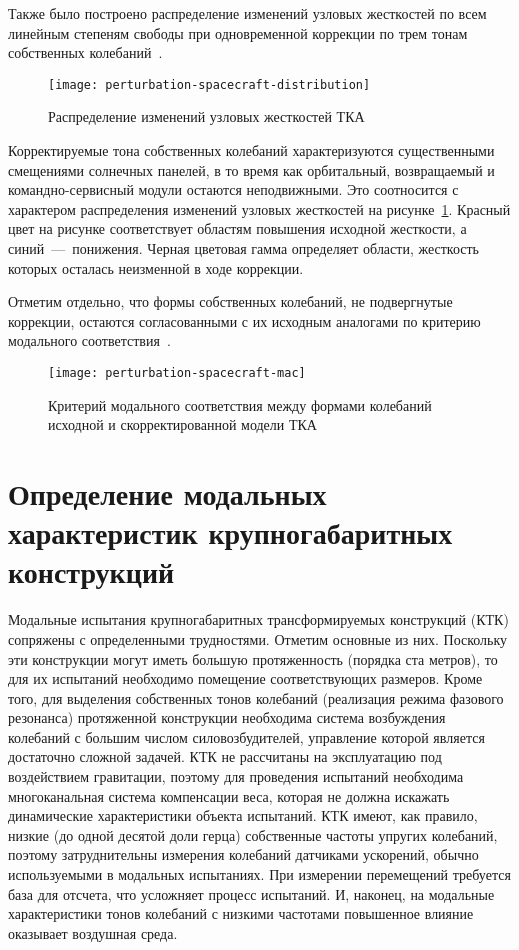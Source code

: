 Также было построено распределение изменений узловых жесткостей по всем линейным степеням свободы при одновременной коррекции по трем тонам собственных колебаний~.

\begin{figure}[H]
	\centering
	\texttt{[image: perturbation-spacecraft-distribution]}
	\caption{Распределение изменений узловых жесткостей ТКА} \label{fig:perturbation-spacecraft-distribution}
\end{figure}

Корректируемые тона собственных колебаний характеризуются существенными смещениями солнечных панелей, в то время как орбитальный, возвращаемый и командно-сервисный модули остаются неподвижными. Это соотносится с характером распределения изменений узловых жесткостей на рисунке~\ref{fig:perturbation-spacecraft-distribution}. Красный цвет на рисунке соответствует областям повышения исходной жесткости, а синий~---~понижения. Черная цветовая гамма определяет области, жесткость которых осталась неизменной в ходе коррекции.

Отметим отдельно, что формы собственных колебаний, не подвергнутые коррекции, остаются согласованными с их исходным аналогами по критерию модального соответствия~.

\begin{figure}[!htb]
	\centering
	\texttt{[image: perturbation-spacecraft-mac]}
	\caption{Критерий модального соответствия между формами колебаний исходной и скорректированной модели ТКА} \label{fig:perturbation-spacecraft-mac}
\end{figure}

\section{Определение модальных характеристик крупногабаритных конструкций}

Модальные испытания крупногабаритных трансформируемых конструкций (КТК) сопряжены с определенными трудностями. Отметим основные из них. Поскольку эти конструкции могут иметь большую протяженность (порядка ста метров), то для их испытаний необходимо помещение соответствующих размеров. Кроме того, для выделения собственных тонов колебаний (реализация режима фазового резонанса) протяженной конструкции необходима система возбуждения колебаний с большим числом силовозбудителей, управление которой является достаточно сложной задачей. КТК не рассчитаны на эксплуатацию под воздействием гравитации, поэтому для проведения испытаний необходима многоканальная система компенсации веса, которая не должна искажать динамические характеристики объекта испытаний. КТК имеют, как правило, низкие (до одной десятой доли герца) собственные частоты упругих колебаний, поэтому затруднительны измерения колебаний датчиками ускорений, обычно используемыми в модальных испытаниях. При измерении перемещений требуется база для отсчета, что усложняет процесс испытаний. И, наконец, на модальные характеристики тонов колебаний с низкими частотами повышенное влияние оказывает воздушная среда. 


